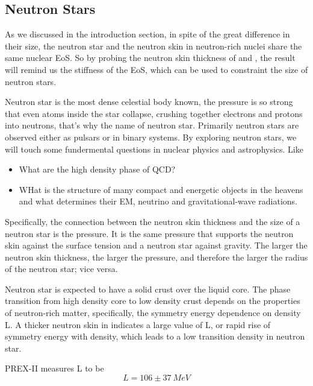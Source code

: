 \subsection{Neutron Stars}
As we discussed in the introduction section, in spite of the great difference
in their size, the neutron star and the neutron skin in neutron-rich nuclei
share the same nuclear EoS. So by probing the neutron skin thickness of \Pb and
\Ca, the result will remind us the stiffness of the EoS, which can be used to
constraint the size of neutron stars.

Neutron star is the most dense celestial body known, the pressure is so strong
that even atoms inside the star collapse, crushing together electrons
and protons into neutrons, that's why the name of neutron star. Primarily neutron
stars are observed either as pulsars or in binary systems. By exploring
neutron stars, we will touch some fundermental questions in nuclear physics and 
astrophysics. Like
\begin{itemize}
    \item What are the high density phase of QCD?
    \item WHat is the structure of many compact and energetic objects in the heavens
	and what determines their EM, neutrino and gravitational-wave radiations.
\end{itemize}

Specifically, the connection between the neutron skin thickness and the size of
a neutron star is the pressure. It is the same pressure that supports the neutron
skin against the surface tension and a neutron star against gravity. 
The larger the neutron skin thickness, the larger the pressure, and therefore 
the larger the radius of the neutron star; vice versa.

Neutron star is expected to have a solid crust over the liquid core. The phase transition
from high density core to low density crust depends on the properties of
neutron-rich matter, specifically, the symmetry energy dependence on density L.
A thicker neutron skin in \Pb indicates a large value of L, or rapid rise of
symmetry energy with density, which leads to a low transition density in neutron
star.

PREX-II measures L to be
\begin{equation}
    L = 106 \pm 37 \ MeV
\end{equation}


